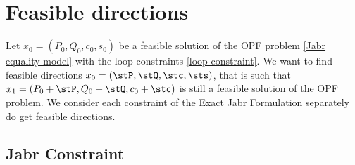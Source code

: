 \documentclass{article}
\newcommand{\gr}[2][]{\todo[color=green!20,#1]{\textsf{G:} #2}}
\begin{document}





\section{Feasible directions}

Let \(x_0 = (P_0,Q_0,c_0,s_0)\) be a feasible solution of the OPF problem \eqref{Jabr equality model} with the loop constraints \eqref{loop constraint}.
We want to find feasible directions \(x_0 = (\stP,\stQ,\stc,\sts)\), that is such that \(x_1 = (P_0+\stP,Q_0+\stQ,c_0+\stc)\) is still a feasible solution of the OPF problem.
We consider each constraint of the Exact Jabr Formulation separately do get feasible directions.

\subsection{Jabr Constraint}
\end{document}
